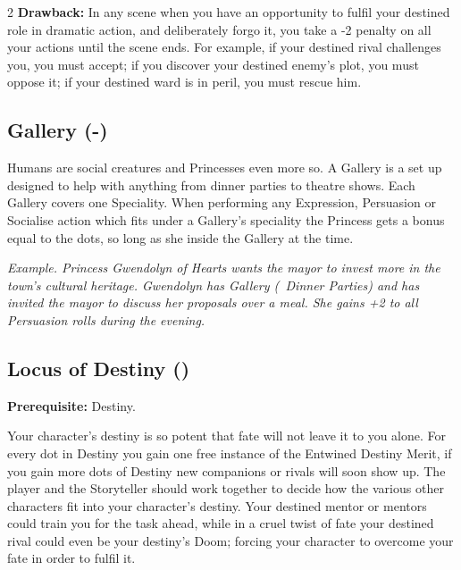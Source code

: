 \begin{multicols}{2}
\textbf{Drawback:} In any scene when you have an opportunity to fulfil your destined role in dramatic action, and deliberately forgo it, you take a -2 penalty on all your actions until the scene ends. For example, if your destined rival challenges you, you must accept; if you discover your destined enemy's plot, you must oppose it; if your destined ward is in peril, you must rescue him.

\subsection*{Gallery (\textbullet\nobreak\hspace{.16667em}-\nobreak\hspace{.16667em}\textbullet\textbullet\textbullet)}

Humans are social creatures and Princesses even more so. A Gallery is a set up designed to help with anything from dinner parties to theatre shows. Each Gallery covers one Speciality. When performing any Expression, Persuasion or Socialise action which fits under a Gallery's speciality the Princess gets a bonus equal to the dots, so long as she inside the Gallery at the time. 

\textit{Example. Princess Gwendolyn of Hearts wants the mayor to invest more in the town's cultural heritage. Gwendolyn has Gallery (\textbullet\textbullet\, Dinner Parties) and has invited the mayor to discuss her proposals over a meal. She gains +2 to all Persuasion rolls during the evening.}

\subsection*{Locus of Destiny (\textbullet\textbullet\textbullet\textbullet\textbullet)}

\textbf{Prerequisite:} Destiny. 

Your character's destiny is so potent that fate will not leave it to you alone. For every dot in Destiny you gain one free instance of the Entwined Destiny Merit, if you gain more dots of Destiny new companions or rivals will soon show up. The player and the Storyteller should work together to decide how the various other characters fit into your character's destiny. Your destined mentor or mentors could train you for the task ahead, while in a cruel twist of fate your destined rival could even be your destiny's Doom; forcing your character to overcome your fate in order to fulfil it. 


\end{multicols}

